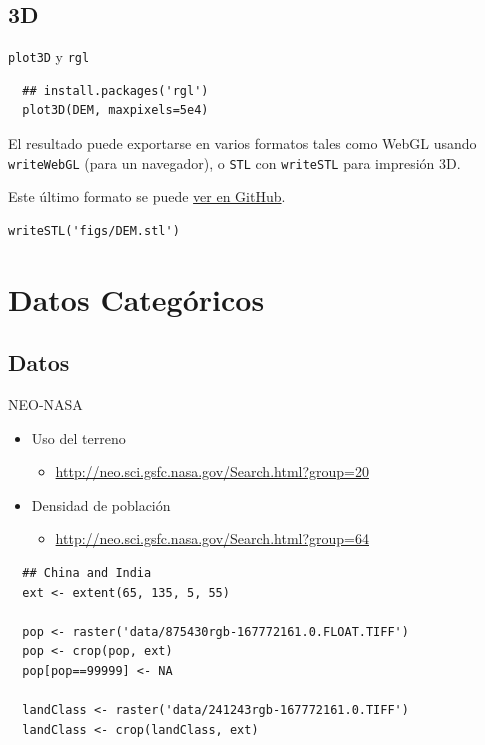 \documentclass[xcolor={usenames,svgnames,dvipsnames}]{beamer}
\begin{document}
\subsection{3D}
\label{sec-2-4}

\begin{frame}[fragile,label=sec-2-4-1]{\texttt{plot3D} y \texttt{rgl}}
 \lstset{language=R,label= ,caption= ,numbers=none}
\begin{lstlisting}
  ## install.packages('rgl')
  plot3D(DEM, maxpixels=5e4)
\end{lstlisting}

\begin{block}{}
El resultado puede exportarse en varios formatos tales como WebGL
usando \texttt{writeWebGL} (para un navegador), o \texttt{STL} con \texttt{writeSTL} para
impresión 3D. 

Este último formato se puede \href{https://github.com/oscarperpinan/spacetime-vis/blob/gh-pages/images/DEM.stl}{ver en GitHub}.

\lstset{language=R,label= ,caption= ,numbers=none}
\begin{lstlisting}
writeSTL('figs/DEM.stl')
\end{lstlisting}
\end{block}
\end{frame}

\section{Datos Categóricos}
\label{sec-3}

\subsection{Datos}
\label{sec-3-1}

\begin{frame}[fragile,label=sec-3-1-1]{NEO-NASA}
 \begin{itemize}
\item Uso del terreno
\begin{itemize}
\item \url{http://neo.sci.gsfc.nasa.gov/Search.html?group=20}
\end{itemize}
\item Densidad de población
\begin{itemize}
\item \url{http://neo.sci.gsfc.nasa.gov/Search.html?group=64}
\end{itemize}
\end{itemize}
\lstset{language=R,label= ,caption= ,numbers=none}
\begin{lstlisting}
  ## China and India  
  ext <- extent(65, 135, 5, 55)
  
  pop <- raster('data/875430rgb-167772161.0.FLOAT.TIFF')
  pop <- crop(pop, ext)
  pop[pop==99999] <- NA
  
  landClass <- raster('data/241243rgb-167772161.0.TIFF')
  landClass <- crop(landClass, ext)
\end{lstlisting}
\end{frame}
\end{document}
